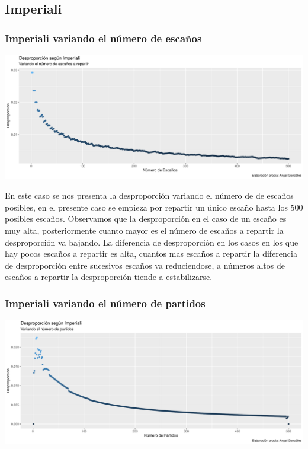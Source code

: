 \documentclass[12pt,a4paper,]{book}
\numberwithin{dummy}{section}
\theoremstyle{ocrenumbox}
\theoremstyle{blacknumex}
\theoremstyle{blacknumbox}
\theoremstyle{ocrenum}
\theoremstyle{ocrenum}
\begin{document}
\hypertarget{imperiali}{%
\subsection{Imperiali}\label{imperiali}}

\hypertarget{imperiali-variando-el-nuxfamero-de-escauxf1os}{%
\subsubsection{Imperiali variando el número de
escaños}\label{imperiali-variando-el-nuxfamero-de-escauxf1os}}

\begin{center}\includegraphics[width=0.95\linewidth]{figurasR/unnamed-chunk-24-1} \end{center}

En este caso se nos presenta la desproporción variando el número de de
escaños posibles, en el presente caso se empieza por repartir un único
escaño hasta los 500 posibles escaños. Observamos que la desproporción
en el caso de un escaño es muy alta, posteriormente cuanto mayor es el
número de escaños a repartir la desproporción va bajando. La diferencia
de desproporción en los casos en los que hay pocos escaños a repartir es
alta, cuantos mas escaños a repartir la diferencia de desproporción
entre sucesivos escaños va reduciendose, a números altos de escaños a
repartir la desproporción tiende a estabilizarse.

\hypertarget{imperiali-variando-el-nuxfamero-de-partidos}{%
\subsubsection{Imperiali variando el número de
partidos}\label{imperiali-variando-el-nuxfamero-de-partidos}}

\begin{center}\includegraphics[width=0.95\linewidth]{figurasR/unnamed-chunk-25-1} \end{center}
\end{document}
